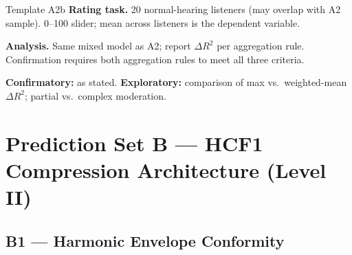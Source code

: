 \documentclass[11pt, a4paper]{article}
\begin{document}
\begin{predbox}{Template A2b}
\textbf{Rating task.}  20 normal-hearing listeners (may overlap with A2 sample).
0–100 slider; mean across listeners is the dependent variable.

\textbf{Analysis.}  Same mixed model as A2; report $\Delta R^2$ per aggregation
rule.  Confirmation requires both aggregation rules to meet all three criteria.

\textbf{Confirmatory:} as stated.
\textbf{Exploratory:} comparison of max vs.\ weighted-mean $\Delta R^2$;
partial vs.\ complex moderation.

\end{predbox}

\section{Prediction Set B — HCF1 Compression Architecture (Level II)}

\subsection{B1 — Harmonic Envelope Conformity}
\end{document}
